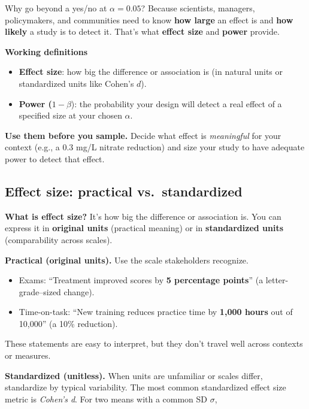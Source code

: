 \documentclass[
  letterpaper,
  DIV=11,
  numbers=noendperiod]{scrreprt}
\providecommand{\tightlist}{%
  \setlength{\itemsep}{0pt}\setlength{\parskip}{0pt}}
\begin{document}
Why go beyond a yes/no at \(\alpha=0.05\)? Because scientists, managers,
policymakers, and communities need to know \textbf{how large} an effect
is and \textbf{how likely} a study is to detect it. That's what
\textbf{effect size} and \textbf{power} provide.

\textbf{Working definitions}

\begin{itemize}
\item
  \textbf{Effect size}: how big the difference or association is (in
  natural units or standardized units like Cohen's \(d\)).
\item
  \textbf{Power (}\(1-\beta\)): the probability your design will detect
  a real effect of a specified size at your chosen \(\alpha\).
\end{itemize}

\textbf{Use them before you sample.} Decide what effect is
\emph{meaningful} for your context (e.g., a 0.3 mg/L nitrate reduction)
and size your study to have adequate power to detect that effect.

\subsection{Effect size: practical
vs.~standardized}\label{effect-size-practical-vs.-standardized}

\textbf{What is effect size?} It's how big the difference or association
is. You can express it in \textbf{original units} (practical meaning) or
in \textbf{standardized units} (comparability across scales).

\textbf{Practical (original units).} Use the scale stakeholders
recognize.

\begin{itemize}
\tightlist
\item
  Exams: ``Treatment improved scores by \textbf{5 percentage points}''
  (a letter-grade--sized change).
\item
  Time-on-task: ``New training reduces practice time by \textbf{1,000
  hours} out of 10,000'' (a 10\% reduction).
\end{itemize}

These statements are easy to interpret, but they don't travel well
across contexts or measures.

\textbf{Standardized (unitless).} When units are unfamiliar or scales
differ, standardize by typical variability. The most common standardized
effect size metric is \emph{Cohen's d}. For two means with a common SD
\(\sigma\),
\end{document}
